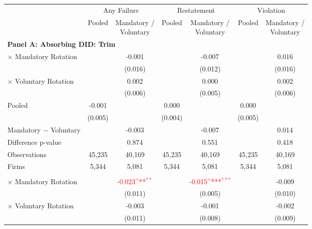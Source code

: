 \documentclass[10pt]{article}
\newcommand{\sym}[1]{\textsuperscript{#1}}
\begin{document}
\begin{minipage}{19cm}\fontsize{10}{12}\selectfont\setlength{\tabcolsep}{4pt}\renewcommand{\arraystretch}{1.12}


\def\sym#1{\ifmmode^{#1}\else\(^{#1}\)\fi}
\centering
{}
\label{tab:absorbing-transition-school-985-upgrade-no-auditfirm-fe}
\begin{threeparttable}

\begin{tabular}{l cc cc cc}
\toprule
 & \multicolumn{2}{c}{Any Failure} & \multicolumn{2}{c}{Restatement} & \multicolumn{2}{c}{Violation} \\
\cmidrule(lr){2-3}\cmidrule(lr){4-5}\cmidrule(lr){6-7}
 & Pooled & \shortstack{Mandatory /\\Voluntary} & Pooled & \shortstack{Mandatory /\\Voluntary} & Pooled & \shortstack{Mandatory /\\Voluntary} \\
\midrule
\multicolumn{7}{l}{\textbf{Panel A: Absorbing DID: Trim}} \\
$\times$ Mandatory Rotation &  & -0.001 &  & -0.007 &  & 0.016 \\
 &  & (0.016) &  & (0.012) &  & (0.016) \\
$\times$ Voluntary Rotation &  & 0.002 &  & 0.000 &  & 0.002 \\
 &  & (0.006) &  & (0.005) &  & (0.006) \\
Pooled & -0.001 &  & 0.000 &  & 0.000 &  \\
 & (0.005) &  & (0.004) &  & (0.005) &  \\
Mandatory $-$ Voluntary &  & -0.003 &  & -0.007 &  & 0.014 \\
Difference p-value &  & 0.874 &  & 0.551 &  & 0.418 \\
Observations & 45,235 & 40,169 & 45,235 & 40,169 & 45,235 & 40,169 \\
Firms & 5,344 & 5,081 & 5,344 & 5,081 & 5,344 & 5,081 \\
\addlinespace
\multicolumn{7}{l}{\textbf{Panel B: Absorbing DID: Strict}} \\
$\times$ Mandatory Rotation &  & \textcolor{red}{-0.023\sym{**}} &  & \textcolor{red}{-0.015\sym{***}} &  & -0.009 \\
 &  & (0.011) &  & (0.005) &  & (0.010) \\
$\times$ Voluntary Rotation &  & -0.003 &  & -0.001 &  & -0.002 \\
 &  & (0.011) &  & (0.008) &  & (0.009) \\

\end{tabular}
\end{threeparttable}
\end{minipage}
\end{document}
